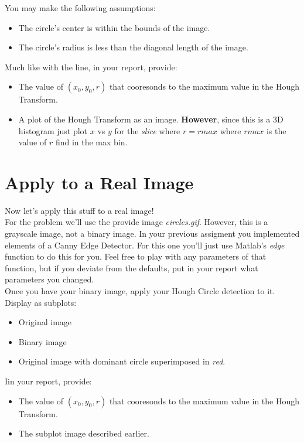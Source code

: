 \documentclass[12pt]{article}
\begin{document}
\noindent
You may make the following assumptions:
\begin{itemize}
\item The circle's center is within the bounds of the image.
\item The circle's radius is less than the diagonal length of the image.
\end{itemize}

\noindent
Much like with the line, in your report, provide:
\begin{itemize}
\item The value of $(x_0, y_0, r)$ that cooresonds to the maximum value in the Hough Transform.
\item A plot of the Hough Transform as an image. \textbf{However}, since this is a 3D histogram just plot $x$ vs $y$ for the \emph{slice} where $r=rmax$ where $rmax$ is the value of $r$ find in the max bin.
\end{itemize}


\newpage
\section{Apply to a Real Image}
Now let's apply this stuff to a real image!\\

\noindent
For the problem we'll use the provide image \emph{circles.gif}.  However, this is a grayscale image, not a binary image.  In your previous assigment you implemented elements of a Canny Edge Detector.  For this one you'll just use Matlab's \emph{edge} function to do this for you.  Feel free to play with any parameters of that function, but if you deviate from the defaults, put in your report what parameters you changed.\\

\noindent
Once you have your binary image, apply your Hough Circle detection to it.   Display as subplots:
\begin{itemize}
\item Original image
\item Binary image
\item Original image with dominant circle superimposed in \emph{red}.
\end{itemize}


\noindent
Iin your report, provide:
\begin{itemize}
\item The value of $(x_0, y_0, r)$ that cooresonds to the maximum value in the Hough Transform.
\item The subplot image described earlier.
\end{itemize}
\end{document}
